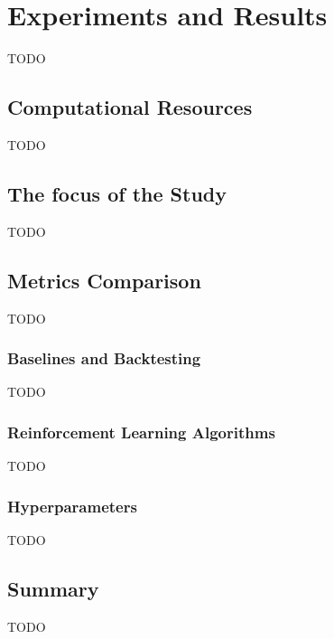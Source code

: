 \documentclass[../xlapes02]{subfiles}
\begin{document}
    \chapter{Experiments and Results}\label{sec:experiments-and-results}
    TODO

    \section{Computational Resources}\label{sec:computational-resources}
    TODO

    \section{The focus of the Study}\label{sec:the-focus-of-the-study}
    TODO

    \section{Metrics Comparison}\label{sec:metrics-comparison}
    TODO

    \subsection{Baselines and Backtesting}\label{subsec:baselines-and-backtesting}
    TODO

    \subsection{Reinforcement Learning Algorithms}\label{subsec:rl-algorithms}
    TODO

    \subsection{Hyperparameters}\label{subsec:hyperparameters}
    TODO


    \section{Summary}\label{sec:summary}
    TODO
\end{document}
